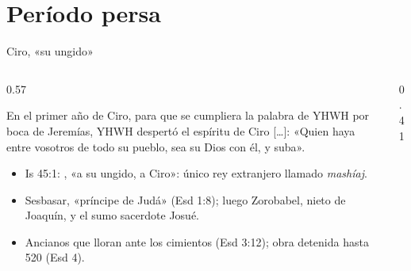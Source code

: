 \section{Período persa}
\begin{frame}{Ciro, «su ungido»}
\begin{columns}[c,onlytextwidth]
\begin{column}{0.57\textwidth}
\begin{cita}En el primer año de Ciro, para que se cumpliera la palabra de YHWH por boca de Jeremías, YHWH despertó el espíritu de Ciro [\ldots]: «Quien haya entre vosotros de todo su pueblo, sea su Dios con él, y suba».\end{cita}
\scriptsize
\begin{itemize}
\item Is 45:1: , «a su ungido, a Ciro»: único rey extranjero llamado \emph{mashíaj}.
\item Sesbasar, «príncipe de Judá» (Esd 1:8); luego Zorobabel, nieto de Joaquín, y el sumo sacerdote Josué.
\item Ancianos que lloran ante los cimientos (Esd 3:12); obra detenida hasta 520 (Esd 4).
\end{itemize}
\end{column}
\begin{column}{0.41\textwidth}\end{column}
\end{columns}
\end{frame}

